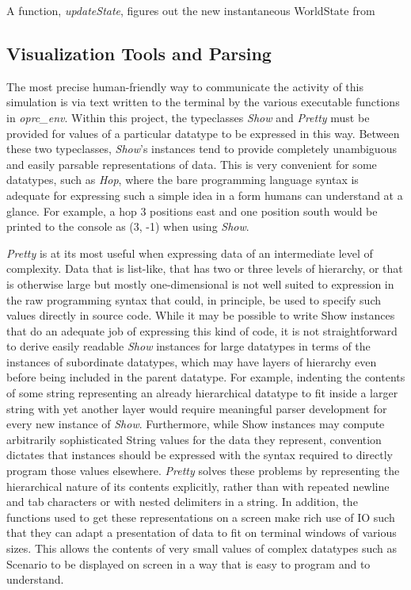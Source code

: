 A function, \textit{updateState}, figures out the new instantaneous WorldState from

\subsection{Visualization Tools and Parsing}

The most precise human-friendly way to communicate the activity of this simulation is via text written to the terminal by the various executable functions in \textit{oprc\_env}. Within this project, the typeclasses \textit{Show} and \textit{Pretty} must be provided for values of a particular datatype to be expressed in this way. Between these two typeclasses, \textit{Show}'s instances tend to provide completely unambiguous and easily parsable representations of data. This is very convenient for some datatypes, such as \textit{Hop}, where the bare programming language syntax is adequate for expressing such a simple idea in a form humans can understand at a glance. For example, a hop 3 positions east and one position south would be printed to the console as (3, -1) when using \textit{Show}.

\textit{Pretty} is at its most useful when expressing data of an intermediate level of complexity. Data that is list-like, that has two or three levels of hierarchy, or that is otherwise large but mostly one-dimensional is not well suited to expression in the raw programming syntax that could, in principle, be used to specify such values directly in source code. While it may be possible to write Show instances that do an adequate job of expressing this kind of code, it is not straightforward to derive easily readable \textit{Show} instances for large datatypes in terms of the instances of subordinate datatypes, which may have layers of hierarchy even before being included in the parent datatype. For example, indenting the contents of some string representing an already hierarchical datatype to fit inside a larger string with yet another layer would require meaningful parser development for every new instance of \textit{Show}. Furthermore, while Show instances may compute arbitrarily sophisticated String values for the data they represent, convention dictates that instances should be expressed with the syntax required to directly program those values elsewhere. \textit{Pretty} solves these problems by representing the hierarchical nature of its contents explicitly, rather than with repeated newline and tab characters or with nested delimiters in a string. In addition, the functions used to get these representations on a screen make rich use of IO such that they can adapt a presentation of data to fit on terminal windows of various sizes. This allows the contents of very small values of complex datatypes such as Scenario to be displayed on screen in a way that is easy to program and to understand.

